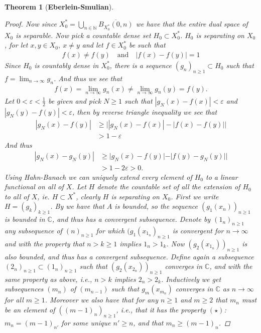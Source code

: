 \documentclass[10pt,twoside,openany,final]{memoir}
\theoremstyle{break}
\newtheorem{theorem}[section]{Theorem}
\theoremstyle{Break}
\newcommand{\C}{\mathbb{C}}
\newcommand{\N}{\mathbb{N}}
\begin{document}
\begin{theorem}[\bfseries{Eberlein-Smulian}]
\begin{proof}
Now since $X_{0}^*= \bigcup_{n \in \N} \overline{B_{X_{0}^*}(0,n)} $ we have that the entire dual space of $X_0$ is separable. Now pick a countable dense set $H_0 \subset X_0^*$. $H_{0}$ is separating on $X_{0}$, for let $x,y \in X_{0}, \ x \neq y$ and let $f \in X_{0}^*$ be such that
\begin{align*}
f(x)\neq f(y) \quad \text{and} \quad |f(x)-f(y)|=1
\end{align*}
Since $H_{0}$ is countably dense in $X_{0}^*$, there is a sequence $(g_{n})_{n \geq 1} \subset H_{0}$ such that $\displaystyle f = \lim_{n \to \infty} g_{n}$. And thus we see that
\begin{align*}
f(x)=\lim_{n \to \infty} g_{n}(x) \neq \lim_{n \to \infty} g_{n}(y) = f(y).
\end{align*}
Let $0 < \varepsilon < \frac12$ be given and pick $N \geq 1$ such that $|g_{N}(x)-f(x)|< \varepsilon$ and $|g_{N}(y)-f(y)| < \varepsilon$, then by reverse triangle inequality we see that
\begin{align*}
|g_{N}(x)-f(y)| &\geq \Big| |g_{N}(x)-f(x)|-|f(x)-f(y)| \Big| \\
&> 1-\varepsilon
\end{align*}
And thus
\begin{align*}
|g_{N}(x)-g_{N}(y)| &\geq \Big |g_{N}(x)-f(y)|-|f(y)-g_{N}(y)|\Big|\\
&>1-2\varepsilon >0.
\end{align*} Using Hahn-Banach we can uniquely extend every element of $H_0$ to a linear functional on all of $X$. Let $H$ denote the countable set of all the extension of $H_0$ to all of $X$, ie. $H \subset X^*$, clearly $H$ is separating on $X_{0}$. First we write $H=(g_k)_{k\geq 1}$.
    By  we have that $A$ is bounded, so the sequence $(g_{1}(x_{n}))_{n\geq 1}$ is bounded in $\C$, and thus has a convergent subsequence. Denote by $(1_{n})_{n\geq 1}$ any subsequence of $(n)_{n\geq 1}$ for which $(g_{1}(x_{1_{n}})_{n \geq 1}$ is convergent for $n \to \infty$ and with the property that $n > k \geq 1$ implies $1_{n} > 1_{k}$. Now $(g_{2}(x_{1_{n}}))_{n \geq 1}$ is also bounded, and thus has a convergent subsequence. Define again a subsequence $(2_{n})_{n \geq 1} \subset (1_{n})_{n \geq 1}$ such that $(g_{2}(x_{2_{n}}))_{n \geq 1}$ converges in $\C$, and with the same property as above, i.e., $n > k$ implies $2_{n} > 2_{k}$. Inductively we get subsequences $(m_n)$ of $(m_{n-1})$ such that $g_{m}(x_{m_{n}})$ converges in $\C$ as $n \to \infty$ for all $m \geq 1$. Moreover we also have that for any $n \geq 1$ and $m \geq 2$ that $m_{n}$ must be an element of $((m-1)_{n})_{n\geq 1}$, i.e., that it has the property $(\star)$: $m_{n}=(m-1)_{n'}$ for some unique $n' \geq n$, and that $m_{n} \geq (m-1)_{n}$. 
    

\end{proof}
\end{theorem}
\end{document}
